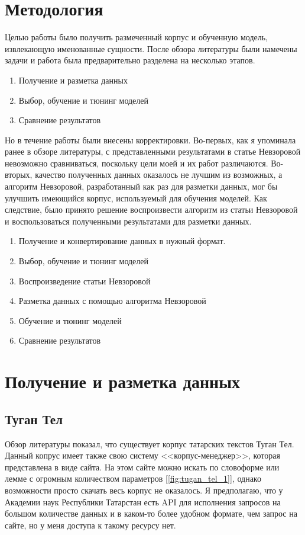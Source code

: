 \section{Методология}

Целью работы было получить размеченный корпус и обученную модель, извлекающую именованные сущности. После обзора литературы были намечены задачи и работа была предварительно разделена на несколько этапов.

\begin{enumerate}
\item Получение и разметка данных
\item Выбор, обучение и тюнинг моделей
\item Сравнение результатов
\end{enumerate}

Но в течение работы были внесены корректировки. Во-первых, как я упоминала ранее в обзоре литературы, с представленными результатами в статье Невзоровой невозможно сравниваться, поскольку цели моей и их работ различаются. Во-вторых, качество полученных данных оказалось не лучшим из возможных, а алгоритм Невзоровой, разработанный как раз для разметки данных, мог бы улучшить имеющийся корпус, используемый для обучения моделей. Как следствие, было принято решение воспроизвести алгоритм из статьи Невзоровой и воспользоваться полученными результатами для разметки данных.

\begin{enumerate}
\item Получение и конвертирование данных в нужный формат.
\item Выбор, обучение и тюнинг моделей
\item Воспроизведение статьи Невзоровой
\item Разметка данных с помощью алгоритма Невзоровой
\item Обучение и тюнинг моделей
\item Сравнение результатов
\end{enumerate}


\section{Получение и разметка данных}

\subsection{Туган Тел}

Обзор литературы показал, что существует корпус татарских текстов Туган Тел\cite{tugan_tel}. Данный копрус имеет также свою систему <<корпус-менеджер>>, которая представлена в виде сайта. На этом сайте можно искать по словоформе или лемме с огромным количеством параметров [\ref{fig:tugan_tel_1}], однако возможности просто скачать весь корпус не оказалось. Я предполагаю, что у Академии наук Республики Татарстан есть API для исполнения запросов на большом количестве данных и в каком-то более удобном формате, чем запрос на сайте, но у меня доступа к такому ресурсу нет. 

